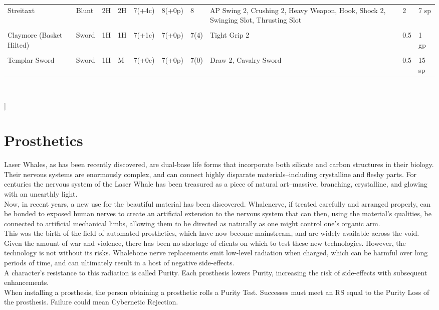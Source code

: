 \documentclass[a4paper, twocolumn, openany]{book}
\begin{document}
{{{\begin{tabular}{p{2cm}p{1.2cm}llllp{1.3cm}p{3.3cm}ll}
	Streitaxt 					& Blunt	 		& 2H & 2H 	& 7(+4c) & 8(+0p) & 8 		& AP Swing 2, Crushing 2, Heavy Weapon, Hook, Shock 2, Swinging Slot, Thrusting Slot 	& 2 	& 7 sp \\ \\
	Claymore (Basket Hilted) 	& Sword			& 1H & 1H 	& 7(+1c) & 7(+0p) & 7(4) 	& Tight Grip 2 																			& 0.5 	& 1 gp \\ \\
	Templar Sword 				& Sword 		& 1H & M 	& 7(+0c) & 7(+0p) & 7(0) 	& Draw 2, \newline Cavalry Sword 																& 0.5 	& 15 sp \\
	\end{tabular}\\[2\baselineskip] }
}]

\section{Prosthetics}

Laser Whales, as has been recently discovered, are dual-base life forms that incorporate both
silicate and carbon structures in their biology. Their nervous systems are enormously complex,
and can connect highly disparate materials--including crystalline and fleshy parts. For centuries
the nervous system of the Laser Whale has been treasured as a piece of natural art--massive,
branching, crystalline, and glowing with an unearthly light.\\
Now, in recent years, a new use for the beautiful material has been discovered. Whalenerve, if
treated carefully and arranged properly, can be bonded to exposed human nerves to create an
artificial extension to the nervous system that can then, using the material’s qualities, be
connected to artificial mechanical limbs, allowing them to be directed as naturally as one might
control one’s organic arm.\\
This was the birth of the field of automated prosthetics, which have now become mainstream,
and are widely available across the void. Given the amount of war and violence, there has been
no shortage of clients on which to test these new technologies. However, the technology is not
without its risks. Whalebone nerve replacements emit low-level radiation when charged, which
can be harmful over long periods of time, and can ultimately result in a host of negative
side-effects.\\
A character’s resistance to this radiation is called Purity. Each prosthesis lowers Purity,
increasing the risk of side-effects with subsequent enhancements.\\
When installing a prosthesis, the person obtaining a prosthetic rolls a Purity Test. Successes
must meet an RS equal to the Purity Loss of the prosthesis. Failure could mean Cybernetic
Rejection.\\

}
\end{document}
